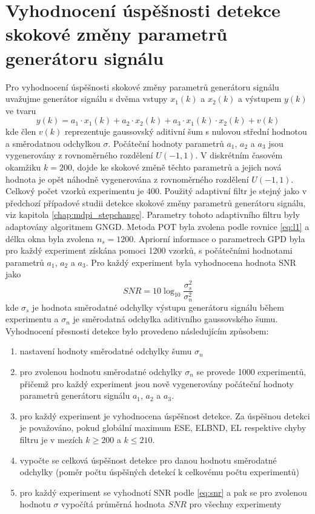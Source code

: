 \section{Vyhodnocení úspěšnosti detekce skokové změny parametrů generátoru signálu}\label{chap:mdpi_step_stats}
Pro vyhodnocení úspěšnosti skokové změny parametrů generátoru signálu uvažujme generátor signálu s dvěma vstupy $x_1(k)$ a $x_2(k)$ a výstupem $y(k)$ ve tvaru
\begin{equation}
y(k)=a_1\cdot x_1(k)+a_2\cdot x_2(k)+a_3\cdot x_1(k) \cdot x_2(k)+v(k)
\end{equation}
kde člen $v(k)$ reprezentuje gaussovský aditivní šum s nulovou střední hodnotou a směrodatnou odchylkou $\sigma$. Počáteční hodnoty parametrů $a_1$, $a_2$ a $a_3$ jsou vygenerovány z rovnoměrného rozdělení $U(-1,1)$. V diskrétním časovém okamžiku $k=200$, dojde ke skokové změně těchto parametrů a jejich nová hodnota je opět náhodně vygenerována z rovnoměrného rozdělení $U(-1,1)$. Celkový počet vzorků experimentu je 400.
Použitý adaptivní filtr je stejný jako v předchozí případové studii detekce skokové změny parametrů generátoru signálu, viz kapitola \ref{chap:mdpi_stepchange}. Parametry tohoto adaptivního filtru byly adaptovány algoritmem GNGD. Metoda POT byla zvolena podle rovnice \ref{eq:l1} a délka okna byla zvolena $n_s=1200$. Apriorní informace o parametrech GPD byla pro každý experiment získána pomoci 1200 vzorků, s počátečními hodnotami parametrů $a_1$, $a_2$ a $a_3$. Pro každý experiment byla vyhodnocena hodnota SNR jako
\begin{equation}\label{eq:snr}
SNR=10\log_{10}\frac{\sigma_s^2}{\sigma_n^2}
\end{equation}
kde $\sigma_s$  je hodnota směrodatné odchylky výstupu generátoru signálu během experimentu a $\sigma_n$ je směrodatná odchylka aditivního gaussovského šumu. Vyhodnocení přesnosti detekce bylo provedeno následujícím způsobem:
\begin{enumerate}
\item nastavení hodnoty směrodatné odchylky šumu $\sigma_n$
\item pro zvolenou hodnotu směrodatné odchylky $\sigma_n$ se provede 1000 experimentů, přičemž pro každý experiment jsou nově vygenerovány počáteční hodnoty parametrů generátoru signálu $a_1$, $a_2$ a $a_3$.
\item pro každý experiment je vyhodnocena úspěšnost detekce. Za úspěšnou detekci je považováno, pokud globální maximum ESE, ELBND, EL respektive chyby filtru je v mezích $k\geq 200$ a $k\leq 210$. 
\item vypočte se celková úspěšnost detekce pro danou hodnotu směrodatné odchylky (poměr počtu úspěšných detekcí k celkovému počtu experimentů)
\item pro každý experiment se vyhodnotí SNR podle \ref{eq:snr} a pak se pro zvolenou hodnotu $\sigma$ vypočítá průměrná hodnota $SNR$ pro všechny experimenty
\end{enumerate}
